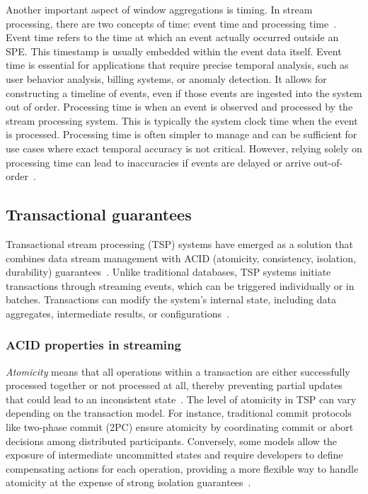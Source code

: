 Another important aspect of window aggregations is timing. In stream processing, there are two concepts of time: event time and processing time~\cite{Akidau:2015:DMP:2824032.2824076, carbone2015apache}. Event time refers to the time at which an event actually occurred outside an SPE. This timestamp is usually embedded within the event data itself. Event time is essential for applications that require precise temporal analysis, such as user behavior analysis, billing systems, or anomaly detection. It allows for constructing a timeline of events, even if those events are ingested into the system out of order. Processing time is when an event is observed and processed by the stream processing system. This is typically the system clock time when the event is processed. Processing time is often simpler to manage and can be sufficient for use cases where exact temporal accuracy is not critical. However, relying solely on processing time can lead to inaccuracies if events are delayed or arrive out-of-order~\cite{Akidau:2015:DMP:2824032.2824076, carbone2015apache}.

\subsection{Transactional guarantees}
\label{transactional}

Transactional stream processing (TSP) systems have emerged as a solution that combines data stream management with ACID (atomicity, consistency, isolation, durability) guarantees~\cite{zhang2024survey, affetti2020tspoon, botan2012transactional}. Unlike traditional databases, TSP systems initiate transactions through streaming events, which can be triggered individually or in batches. Transactions can modify the system's internal state, including data aggregates, intermediate results, or configurations~\cite{zhang2024survey}.

\subsubsection{ACID properties in streaming}

{\em Atomicity} means that all operations within a transaction are either successfully processed together or not processed at all, thereby preventing partial updates that could lead to an inconsistent state~\cite{zhang2024survey}. The level of atomicity in TSP can vary depending on the transaction model. For instance, traditional commit protocols like two-phase commit (2PC) ensure atomicity by coordinating commit or abort decisions among distributed participants. Conversely, some models allow the exposure of intermediate uncommitted states and require developers to define compensating actions for each operation, providing a more flexible way to handle atomicity at the expense of strong isolation guarantees~\cite{10.1145/38713.38742}.

